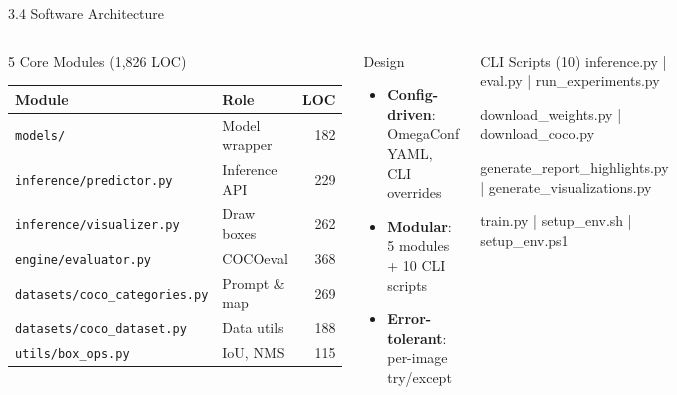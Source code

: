 \documentclass[aspectratio=169,10pt]{beamer}
\begin{document}
\begin{frame}{3.4 Software Architecture}
  \begin{columns}[T]
    \begin{block}{5 Core Modules (1,826 LOC)}
      \footnotesize
      \renewcommand{\arraystretch}{1.1}
      \begin{tabular}{llr}
        \toprule
        \textbf{Module} & \textbf{Role} & \textbf{LOC} \\
        \midrule
        \texttt{models/} & Model wrapper & 182 \\
        \texttt{inference/predictor.py} & Inference API & 229 \\
        \texttt{inference/visualizer.py} & Draw boxes & 262 \\
        \texttt{engine/evaluator.py} & COCOeval & 368 \\
        \texttt{datasets/coco\_categories.py} & Prompt \& map & 269 \\
        \texttt{datasets/coco\_dataset.py} & Data utils & 188 \\
        \texttt{utils/box\_ops.py} & IoU, NMS & 115 \\
        \bottomrule
      \end{tabular}
    \end{block}

    \begin{block}{Design}
      \footnotesize
      \begin{itemize}\setlength{\itemsep}{3pt}
        \item \textbf{Config-driven}: OmegaConf YAML, CLI overrides
        \item \textbf{Modular}: 5 modules + 10 CLI scripts
        \item \textbf{Error-tolerant}: per-image try/except
      \end{itemize}
    \end{block}
    \vspace{0.1cm}
    \begin{block}{CLI Scripts (10)}
      \tiny
      inference.py | eval.py | run\_experiments.py

      download\_weights.py | download\_coco.py

      generate\_report\_highlights.py | generate\_visualizations.py

      train.py | setup\_env.sh | setup\_env.ps1
    \end{block}
  \end{columns}
\end{frame}
\end{document}
